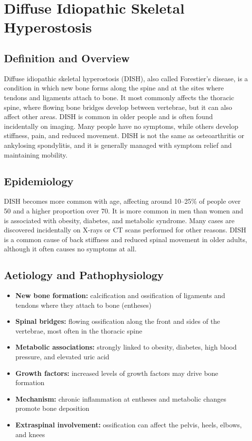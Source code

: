 \chapter{Diffuse Idiopathic Skeletal Hyperostosis}

\section*{Definition and Overview}
Diffuse idiopathic skeletal hyperostosis (DISH), also called Forestier's disease, is a condition in which new bone forms along the spine and at the sites where tendons and ligaments attach to bone. It most commonly affects the thoracic spine, where flowing bone bridges develop between vertebrae, but it can also affect other areas. DISH is common in older people and is often found incidentally on imaging. Many people have no symptoms, while others develop stiffness, pain, and reduced movement. DISH is not the same as osteoarthritis or ankylosing spondylitis, and it is generally managed with symptom relief and maintaining mobility.

\section*{Epidemiology}
DISH becomes more common with age, affecting around 10--25\% of people over 50 and a higher proportion over 70. It is more common in men than women and is associated with obesity, diabetes, and metabolic syndrome. Many cases are discovered incidentally on X-rays or CT scans performed for other reasons. DISH is a common cause of back stiffness and reduced spinal movement in older adults, although it often causes no symptoms at all.

\section*{Aetiology and Pathophysiology}
\begin{itemize}
    \item \textbf{New bone formation:} calcification and ossification of ligaments and tendons where they attach to bone (entheses)
    \item \textbf{Spinal bridges:} flowing ossification along the front and sides of the vertebrae, most often in the thoracic spine
    \item \textbf{Metabolic associations:} strongly linked to obesity, diabetes, high blood pressure, and elevated uric acid
    \item \textbf{Growth factors:} increased levels of growth factors may drive bone formation
    \item \textbf{Mechanism:} chronic inflammation at entheses and metabolic changes promote bone deposition
    \item \textbf{Extraspinal involvement:} ossification can affect the pelvis, heels, elbows, and knees
\end{itemize}

